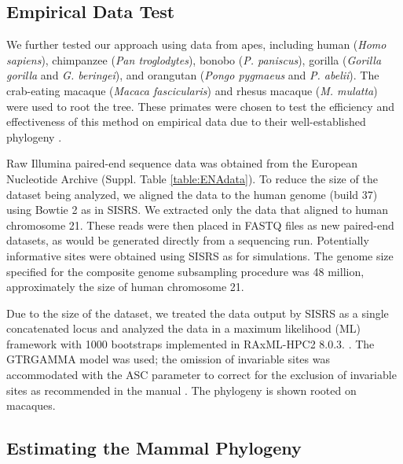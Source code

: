 \documentclass[11pt, oneside]{article}   	%
\begin{document}
\subsection{Empirical Data Test}

We further tested our approach using data from apes, including human (\textit{Homo sapiens}), chimpanzee (\textit{Pan troglodytes}), bonobo (\textit{P. paniscus}), gorilla (\textit{Gorilla gorilla} and \textit{G. beringei}), and orangutan (\textit{Pongo pygmaeus} and \textit{P. abelii}). 
The crab-eating macaque (\textit{Macaca fascicularis}) and rhesus macaque (\textit{M. mulatta}) were used to root the tree. 
These primates were chosen to test the efficiency and effectiveness of this method on empirical data due to their well-established phylogeny \citep{Perelman2011}. 

Raw Illumina paired-end sequence data was obtained from the European Nucleotide Archive (Suppl. Table \ref{table:ENAdata}). 
To reduce the size of the dataset being analyzed, we aligned the data to the human genome (build 37) using Bowtie 2 as in SISRS. 
We extracted only the data that aligned to human chromosome 21. 
These reads were then placed in FASTQ files as new paired-end datasets, as would be generated directly from a sequencing run. 
Potentially informative sites were obtained using SISRS as for simulations. 
The genome size specified for the composite genome subsampling procedure was 48 million, approximately the size of human chromosome 21.

Due to the size of the dataset, we treated the data output by SISRS as a single concatenated locus \citep{Yoder2013} and 
analyzed the data in a maximum likelihood (ML) framework with 1000 bootstraps implemented in RAxML-HPC2 8.0.3. \citep{Stamatakis2006}. 
The GTRGAMMA model was used; the omission of invariable sites was accommodated with the ASC parameter to correct for the exclusion of invariable sites as recommended in the manual \citep{Lewis2001}.
The phylogeny is shown rooted on macaques.

\subsection{Estimating the Mammal Phylogeny}
\end{document}
